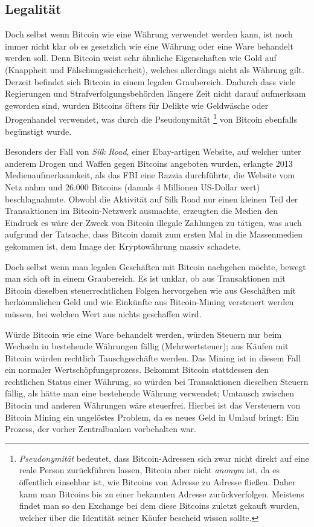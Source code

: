 \subsection{Legalität}

Doch selbst wenn Bitcoin wie eine Währung verwendet werden kann, ist noch immer nicht klar ob es gesetzlich wie eine Währung oder eine Ware behandelt werden soll.
Denn Bitcoin weist sehr ähnliche Eigenschaften wie Gold auf (Knappheit und Fälschungssicherheit), welches allerdings nicht als Währung gilt.
Derzeit befindet sich Bitcoin in einem legalen Graubereich.
Dadurch dass viele Regierungen und Strafverfolgungsbehörden längere Zeit nicht darauf aufmerksam geworden sind, wurden Bitcoins öfters für Delikte wie Geldwäsche  oder Drogenhandel  verwendet, was durch die Pseudonymität%
\footnote{\emph{Pseudonymität} bedeutet, dass Bitcoin-Adressen sich zwar nicht direkt auf eine reale Person zurückführen lassen, Bitcoin aber nicht \emph{anonym} ist, da es öffentlich einsehbar ist, wie Bitcoins von Adresse zu Adresse fließen.
Daher kann man Bitcoins bis zu einer bekannten Adresse zurückverfolgen.
Meistens findet man so den Exchange bei dem diese Bitcoins zuletzt gekauft wurden, welcher über die Identität seiner Käufer bescheid wissen sollte.}
von Bitcoin ebenfalls begünstigt wurde.

Besonders der Fall von \emph{Silk Road}, einer Ebay-artigen Website, auf welcher unter anderem Drogen und Waffen gegen Bitcoins angeboten wurden, erlangte 2013 Medienaufmerksamkeit, als das FBI eine Razzia durchführte, die Website vom Netz nahm und 26.000 Bitcoins (damals 4 Millionen US-Dollar wert) beschlagnahmte.
Obwohl die Aktivität auf Silk Road nur einen kleinen Teil der Transaktionen im Bitcoin-Netzwerk ausmachte, erzeugten die Medien den Eindruck es wäre der Zweck von Bitcoin illegale Zahlungen zu tätigen, was auch aufgrund der Tatsache, dass Bitcoin damit zum ersten Mal in die Massenmedien gekommen ist, dem Image der Kryptowährung massiv schadete.

Doch selbst wenn man legalen Geschäften mit Bitcoin nachgehen möchte, bewegt man sich oft in einem Graubereich.
Es ist unklar, ob aus Transaktionen mit Bitcoin dieselben steuerrechtlichen Folgen hervorgehen wie aus Geschäften mit herkömmlichen Geld und wie Einkünfte aus Bitcoin-Mining versteuert werden müssen, bei welchen Wert aus nichts geschaffen wird.

Würde Bitcoin wie eine Ware behandelt werden, würden Steuern nur beim Wechseln in bestehende Währungen fällig (Mehrwertsteuer); aus Käufen mit Bitcoin würden rechtlich Tauschgeschäfte werden.
Das Mining ist in diesem Fall ein normaler Wertschöpfungsprozess.
Bekommt Bitcoin stattdessen den rechtlichen Status einer Währung, so würden bei Transaktionen dieselben Steuern fällig, als hätte man eine bestehende Währung verwendet; Umtausch zwischen Bitocin und anderen Währungen wäre steuerfrei.
Hierbei ist das Versteuern von Bitcoin Mining ein ungelöstes Problem, da es neues Geld in Umlauf bringt:
Ein Prozess, der vorher Zentralbanken vorbehalten war.
